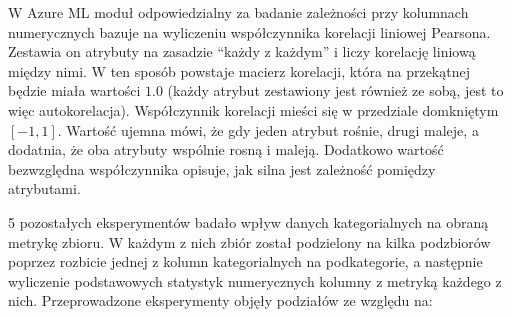 W Azure ML moduł odpowiedzialny za badanie zależności przy kolumnach numerycznych bazuje na wyliczeniu współczynnika korelacji liniowej Pearsona.
Zestawia on atrybuty na zasadzie ``każdy z każdym'' i liczy korelację liniową między nimi.
W ten sposób powstaje macierz korelacji, która na przekątnej będzie miała wartości \( 1.0 \) (każdy atrybut zestawiony jest również ze sobą, jest to więc autokorelacja).
Współczynnik korelacji mieści się w przedziale domkniętym \( [-1, 1] \).
Wartość ujemna mówi, że gdy jeden atrybut rośnie, drugi maleje, a dodatnia, że oba atrybuty wspólnie rosną i maleją.
Dodatkowo wartość bezwzględna współczynnika opisuje, jak silna jest zależność pomiędzy atrybutami.

5 pozostałych eksperymentów badało wpływ danych kategorialnych na obraną metrykę zbioru.
W każdym z nich zbiór został podzielony na kilka podzbiorów poprzez rozbicie jednej z kolumn kategorialnych na podkategorie, a następnie wyliczenie podstawowych statystyk numerycznych kolumny z metryką każdego z nich.
Przeprowadzone eksperymenty objęły podziałów ze względu na:

